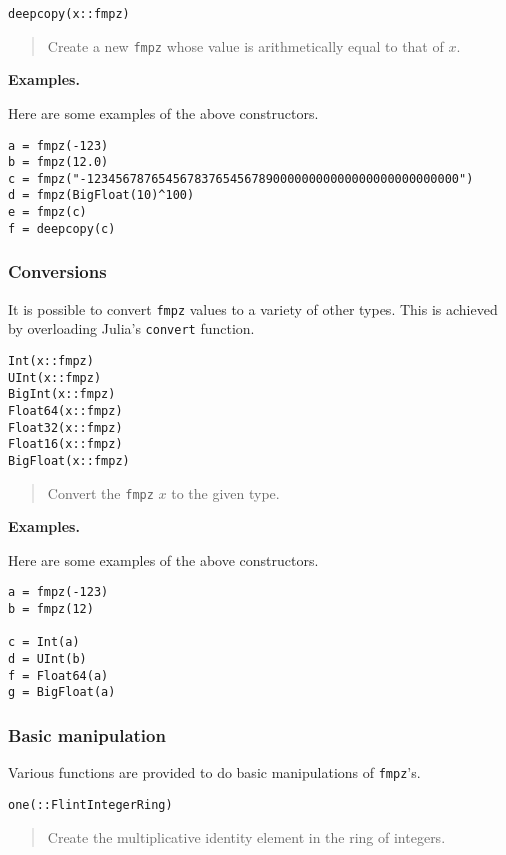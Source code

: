 \documentclass[a4paper,10pt]{article}
\newcommand{\code}{\lstinline}
\newcommand{\desc}[1]{\vspace{-3mm}\begin{quote}#1\end{quote}}
\begin{document}
\begin{lstlisting}
deepcopy(x::fmpz)
\end{lstlisting}

\desc{Create a new \code{fmpz} whose value is arithmetically equal to that of $x$.}

\textbf{Examples.}

Here are some examples of the above constructors.

\begin{lstlisting}
a = fmpz(-123)
b = fmpz(12.0)
c = fmpz("-1234567876545678376545678900000000000000000000000000")
d = fmpz(BigFloat(10)^100)
e = fmpz(c)
f = deepcopy(c)
\end{lstlisting}

\subsubsection{Conversions}

It is possible to convert \code{fmpz} values to a variety of other types. This is
achieved by overloading Julia's \code{convert} function.

\begin{lstlisting}
Int(x::fmpz)
UInt(x::fmpz)
BigInt(x::fmpz)
Float64(x::fmpz)
Float32(x::fmpz)
Float16(x::fmpz)
BigFloat(x::fmpz)
\end{lstlisting}

\desc{Convert the \code{fmpz} $x$ to the given type.}

\textbf{Examples.}

Here are some examples of the above constructors.

\begin{lstlisting}
a = fmpz(-123)
b = fmpz(12)

c = Int(a)
d = UInt(b)
f = Float64(a)
g = BigFloat(a)
\end{lstlisting}

\subsubsection{Basic manipulation}

Various functions are provided to do basic manipulations of \code{fmpz}'s.

\begin{lstlisting}
one(::FlintIntegerRing)
\end{lstlisting}

\desc{Create the multiplicative identity element in the ring of integers.}
\end{document}
